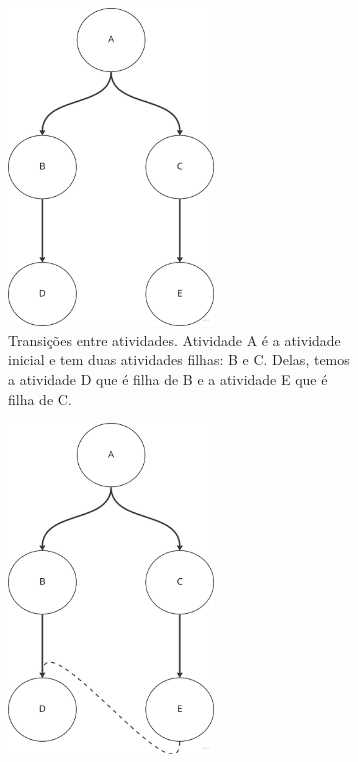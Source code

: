 \begin{figure}
    \centering

    \begin{subfigure}[b]{0.45\textwidth}
        \centering
        \includegraphics[width=0.6\textwidth]{imgs/Flux/Transicoes/normal.png}
        \caption{Transições entre atividades. Atividade A é a atividade inicial e tem duas atividades filhas: B e C. Delas, temos a atividade D que é filha de B e a atividade E que é filha de C.}
        \label{fig:transition_normal}
    \end{subfigure}
    \hfill
    \begin{subfigure}[b]{0.45\textwidth}
        \centering
        \includegraphics[width=0.6\textwidth]{imgs/Flux/Transicoes/referencia.png}

\end{subfigure}
\end{figure}
